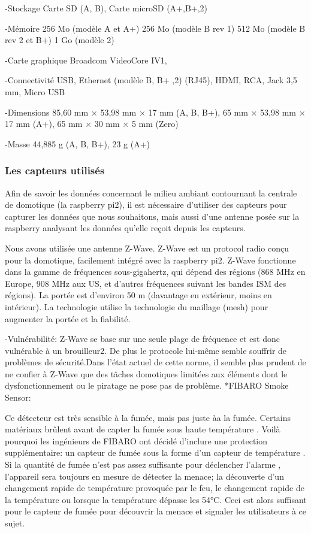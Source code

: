 -Stockage 	Carte SD (A, B), Carte microSD (A+,B+,2)


-Mémoire 	256 Mo (modèle A et A+)
256 Mo (modèle B rev 1)
512 Mo (modèle B rev 2 et B+)
1 Go (modèle 2)


-Carte graphique 	Broadcom VideoCore IV1,


-Connectivité 	USB, Ethernet (modèle B, B+ ,2) (RJ45), HDMI, RCA, Jack 3,5 mm, Micro USB


-Dimensions 	85,60 mm × 53,98 mm × 17 mm (A, B, B+),
65 mm × 53,98 mm × 17 mm (A+),
65 mm × 30 mm × 5 mm (Zero)


-Masse 	44,885 g (A, B, B+), 23 g (A+)

\subsubsection{Les capteurs utilisés}
Afin de savoir les données concernant le milieu ambiant contournant la centrale de domotique (la raspberry pi2), il est nécessaire d'utiliser des capteurs pour capturer les données que nous souhaitons, mais aussi d'une antenne posée sur la raspberry analysant les données qu'elle reçoit depuis les capteurs.

Nous avons utilisée une antenne Z-Wave. Z-Wave est un protocol radio conçu pour la domotique, facilement intégré avec la raspberry pi2. Z-Wave fonctionne dans la gamme de fréquences sous-gigahertz, qui dépend des régions (868 MHz en Europe, 908 MHz aux US, et d'autres fréquences suivant les bandes ISM des régions). La portée est d'environ 50 m (davantage en extérieur, moins en intérieur). La technologie utilise la technologie du maillage (mesh) pour augmenter la portée et la fiabilité.

-Vulnérabilité:
Z-Wave se base sur une seule plage de fréquence et est donc vulnérable à un brouilleur2. De plus le protocole lui-même semble souffrir de problèmes de sécurité.Dans l'état actuel de cette norme, il semble plus prudent de ne confier à Z-Wave que des tâches domotiques limitées aux éléments dont le dysfonctionnement ou le piratage ne pose pas de problème.
*FIBARO Smoke Sensor:

Ce détecteur est très sensible à la fumée, mais pas juste àa la fumée. Certains matériaux brûlent avant de capter la fumée sous haute température . Voilà pourquoi les ingénieurs de  FIBARO ont décidé d'inclure une protection supplémentaire: un capteur de fumée sous la forme d'un capteur de température . Si la quantité de fumée n'est pas assez suffisante pour déclencher l'alarme , l'appareil sera toujours en mesure de détecter la menace; la découverte d'un changement rapide de température provoquée par le feu, le changement rapide de la température ou lorsque la température dépasse les 54°C. Ceci est alors suffisant pour le capteur de fumée pour découvrir la menace et signaler les utilisateurs à ce sujet. 


